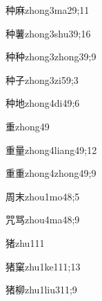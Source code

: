 \begin{verbete}{种麻}{zhong3ma2}{9;11}
\end{verbete}

\begin{verbete}{种薯}{zhong3shu3}{9;16}
\end{verbete}

\begin{verbete}{种种}{zhong3zhong3}{9;9}
\end{verbete}

\begin{verbete}{种子}{zhong3zi5}{9;3}
\end{verbete}

\begin{verbete}{种地}{zhong4di4}{9;6}
\end{verbete}

\begin{verbete}{重}{zhong4}{9}
\end{verbete}

\begin{verbete}{重量}{zhong4liang4}{9;12}
\end{verbete}

\begin{verbete}{重重}{zhong4zhong4}{9;9}
\end{verbete}

\begin{verbete}{周末}{zhou1mo4}{8;5}
\end{verbete}

\begin{verbete}{咒骂}{zhou4ma4}{8;9}
\end{verbete}

\begin{verbete}{猪}{zhu1}{11}
\end{verbete}

\begin{verbete}{猪窠}{zhu1ke1}{11;13}
\end{verbete}

\begin{verbete}{猪柳}{zhu1liu3}{11;9}
\end{verbete}

